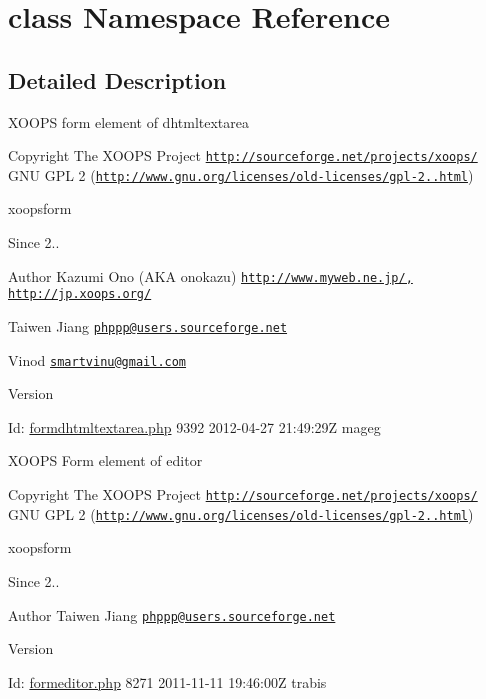 \hypertarget{namespaceclass}{\section{class Namespace Reference}
\label{namespaceclass}
}


\subsection{Detailed Description}
X\-O\-O\-P\-S form element of dhtmltextarea

\begin{DoxyCopyright}{Copyright}
The X\-O\-O\-P\-S Project \href{http://sourceforge.net/projects/xoops/}{\tt http\-://sourceforge.\-net/projects/xoops/}  G\-N\-U G\-P\-L 2 (\href{http://www.gnu.org/licenses/old-licenses/gpl-2.0.html}{\tt http\-://www.\-gnu.\-org/licenses/old-\/licenses/gpl-\/2..\-html})
\end{DoxyCopyright}
xoopsform \begin{DoxySince}{Since}
2.. 
\end{DoxySince}
\begin{DoxyAuthor}{Author}
Kazumi Ono (A\-K\-A onokazu) \href{http://www.myweb.ne.jp/,}{\tt http\-://www.\-myweb.\-ne.\-jp/,} \href{http://jp.xoops.org/}{\tt http\-://jp.\-xoops.\-org/} 

Taiwen Jiang \href{mailto:phppp@users.sourceforge.net}{\tt phppp@users.\-sourceforge.\-net} 

Vinod \href{mailto:smartvinu@gmail.com}{\tt smartvinu@gmail.\-com} 
\end{DoxyAuthor}
\begin{DoxyVersion}{Version}

\end{DoxyVersion}
\begin{DoxyParagraph}{Id\-:}
\hyperlink{formdhtmltextarea_8php}{formdhtmltextarea.\-php} 9392 2012-\/04-\/27 21\-:49\-:29\-Z mageg 
\end{DoxyParagraph}


X\-O\-O\-P\-S Form element of editor

\begin{DoxyCopyright}{Copyright}
The X\-O\-O\-P\-S Project \href{http://sourceforge.net/projects/xoops/}{\tt http\-://sourceforge.\-net/projects/xoops/}  G\-N\-U G\-P\-L 2 (\href{http://www.gnu.org/licenses/old-licenses/gpl-2.0.html}{\tt http\-://www.\-gnu.\-org/licenses/old-\/licenses/gpl-\/2..\-html})
\end{DoxyCopyright}
xoopsform \begin{DoxySince}{Since}
2.. 
\end{DoxySince}
\begin{DoxyAuthor}{Author}
Taiwen Jiang \href{mailto:phppp@users.sourceforge.net}{\tt phppp@users.\-sourceforge.\-net} 
\end{DoxyAuthor}
\begin{DoxyVersion}{Version}

\end{DoxyVersion}
\begin{DoxyParagraph}{Id\-:}
\hyperlink{formeditor_8php}{formeditor.\-php} 8271 2011-\/11-\/11 19\-:46\-:00\-Z trabis 
\end{DoxyParagraph}


